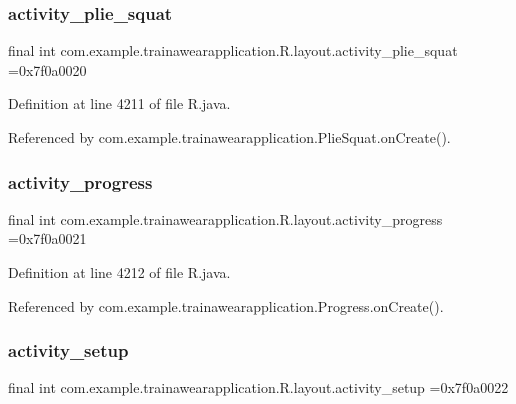 \subsubsection{\texorpdfstring{activity\_plie\_squat}{activity\_plie\_squat}}
{\footnotesize\ttfamily final int com.\+example.\+trainawearapplication.\+R.\+layout.\+activity\+\_\+plie\+\_\+squat =0x7f0a0020\hspace{0.3cm}{\ttfamily [static]}}



Definition at line 4211 of file R.\+java.



Referenced by com.\+example.\+trainawearapplication.\+Plie\+Squat.\+on\+Create().

\mbox{\label{classcom_1_1example_1_1trainawearapplication_1_1_r_1_1layout_a294253efb588aa67a61203d087ba7e72}} 
\subsubsection{\texorpdfstring{activity\_progress}{activity\_progress}}
{\footnotesize\ttfamily final int com.\+example.\+trainawearapplication.\+R.\+layout.\+activity\+\_\+progress =0x7f0a0021\hspace{0.3cm}{\ttfamily [static]}}



Definition at line 4212 of file R.\+java.



Referenced by com.\+example.\+trainawearapplication.\+Progress.\+on\+Create().

\mbox{\label{classcom_1_1example_1_1trainawearapplication_1_1_r_1_1layout_a0ac4d7988d03111570a7765c91541e8c}} 
\subsubsection{\texorpdfstring{activity\_setup}{activity\_setup}}
{\footnotesize\ttfamily final int com.\+example.\+trainawearapplication.\+R.\+layout.\+activity\+\_\+setup =0x7f0a0022\hspace{0.3cm}{\ttfamily [static]}}



